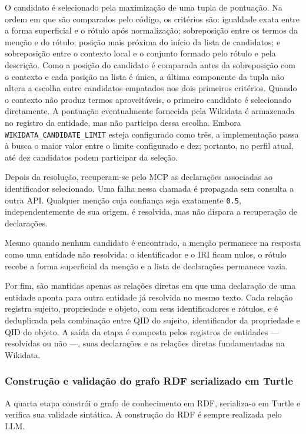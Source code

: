 O candidato é selecionado pela maximização de uma tupla de pontuação. Na ordem
em que são comparados pelo código, os critérios são: igualdade exata entre a
forma superficial e o rótulo após normalização; sobreposição entre os termos da
menção e do rótulo; posição mais próxima do início da lista de candidatos; e
sobreposição entre o contexto local e o conjunto formado pelo rótulo e pela
descrição. Como a posição do candidato é comparada antes da sobreposição com o
contexto e cada posição na lista é única, a última componente da tupla não
altera a escolha entre candidatos empatados nos dois primeiros critérios.
Quando o contexto não produz termos aproveitáveis, o primeiro candidato é
selecionado diretamente. A pontuação eventualmente fornecida pela Wikidata é
armazenada no registro da entidade, mas não participa dessa escolha. Embora
\texttt{WIKIDATA\_CANDIDATE\_LIMIT} esteja
configurado como três, a implementação passa à busca o maior valor entre o
limite configurado e dez; portanto, no perfil atual, até dez candidatos podem
participar da seleção.

Depois da resolução, recuperam-se pelo MCP as declarações associadas ao
identificador selecionado. Uma falha nessa chamada é propagada sem consulta a
outra API. Qualquer menção cuja confiança seja
exatamente \texttt{0.5}, independentemente de sua origem, é resolvida, mas não
dispara a recuperação de declarações.

Mesmo quando nenhum candidato é encontrado, a menção permanece na resposta
como uma entidade não resolvida: o identificador e o IRI ficam nulos, o rótulo
recebe a forma superficial da menção e a lista de declarações permanece vazia.

Por fim, são mantidas apenas as relações diretas em que uma declaração de uma
entidade aponta para outra entidade já resolvida no mesmo texto. Cada relação
registra sujeito, propriedade e objeto, com seus identificadores e rótulos, e é
deduplicada pela combinação entre QID do sujeito, identificador da propriedade
e QID do objeto. A saída da etapa é composta pelos registros de entidades ---
resolvidas ou não ---, suas declarações e as relações diretas fundamentadas na
Wikidata.

\subsubsection{Construção e validação do grafo RDF serializado em Turtle}
\label{subsubsec:hybrid-rdf}

A quarta etapa constrói o grafo de conhecimento em RDF, serializa-o em Turtle e
verifica sua validade sintática. A construção do RDF é sempre realizada pelo LLM.

